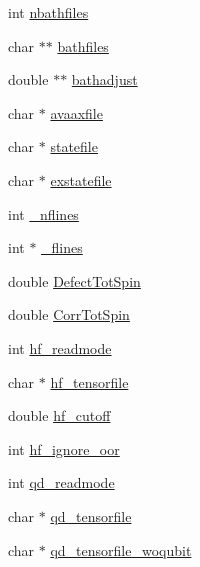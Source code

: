 \begin{DoxyCompactItemize}
\item 
int \hyperlink{structConfig_a26827d7c075042372d21965a827328c3}{nbathfiles}
\item 
char $\ast$$\ast$ \hyperlink{structConfig_afe80a72359e5fc90a5f0f16e9f1d357e}{bathfiles}
\item 
double $\ast$$\ast$ \hyperlink{structConfig_a1ce641fcaac86656dde150e974ff5ff7}{bathadjust}
\item 
char $\ast$ \hyperlink{structConfig_ae3244e507716ae5483bb32a2e4fef809}{avaaxfile}
\item 
char $\ast$ \hyperlink{structConfig_a7ce40e0c9e172e7b2e213101b154760b}{statefile}
\item 
char $\ast$ \hyperlink{structConfig_a70ec8756f364dc3d40201f951476137e}{exstatefile}
\item 
int \hyperlink{structConfig_aae1991f77e6f99acc5342c1944b46736}{\-\_\-nflines}
\item 
int $\ast$ \hyperlink{structConfig_a20fb9e36c4c73d0890445628232c5636}{\-\_\-flines}
\item 
double \hyperlink{structConfig_a716389cd405e9c041cd3ac7c7608ccdd}{Defect\-Tot\-Spin}
\item 
double \hyperlink{structConfig_ac923676eaaf0a911eb890ee419c2b8e6}{Corr\-Tot\-Spin}
\item 
int \hyperlink{structConfig_a3d4d5a3943f20928bdce09e64fa4bb37}{hf\-\_\-readmode}
\item 
char $\ast$ \hyperlink{structConfig_a52710072ec30b071e08c1b62f7450c0f}{hf\-\_\-tensorfile}
\item 
double \hyperlink{structConfig_af82a9ccd3b05247db3da179361faef85}{hf\-\_\-cutoff}
\item 
int \hyperlink{structConfig_a840b086fb6ef148cea4e370967da30e9}{hf\-\_\-ignore\-\_\-oor}
\item 
int \hyperlink{structConfig_adc1119b46a95084ddd4c7bfa2a8d50d9}{qd\-\_\-readmode}
\item 
char $\ast$ \hyperlink{structConfig_a91d5741035098807bc28000a003bd35d}{qd\-\_\-tensorfile}
\item 
char $\ast$ \hyperlink{structConfig_a93e5666a93192db9d1cd361381d64301}{qd\-\_\-tensorfile\-\_\-woqubit}
\end{DoxyCompactItemize}


